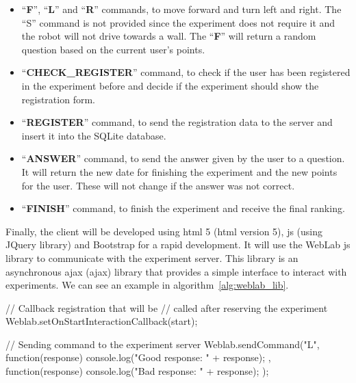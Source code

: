 \begin{itemize}
	\item ``\textbf{F}'', ``\textbf{L}'' and ``\textbf{R}'' commands, to move forward and turn left
	and right. The ``S'' command is not provided since the experiment does not require it and the
	robot will not drive towards a wall. The ``\textbf{F}'' will return a random question based on
	the current user's points.

	\item ``\textbf{CHECK\_REGISTER}'' command, to check if the user has been registered in the
	experiment before and decide if the experiment should show the registration form.

	\item ``\textbf{REGISTER}'' command, to send the registration data to the server and insert it
	into the SQLite database.

	\item ``\textbf{ANSWER}'' command, to send the answer given by the user to a question. It will
	return the new date for finishing the experiment and the new points for the user. These will not
	change if the answer was not correct.

	\item ``\textbf{FINISH}'' command, to finish the experiment and receive the final ranking.
\end{itemize}

Finally, the client will be developed using \acrshort{html} 5 (\acrlong{html} version 5),
\acrlong{js} (using JQuery library) and Bootstrap for a rapid development. It will use the WebLab
\acrlong{js} library to communicate with the experiment server. This library is an asynchronous
\acrshort{ajax} (\acrlong{ajax}) library that provides a simple interface to interact with
experiments. We can see an example in algorithm~\ref{alg:weblab_lib}.

\begin{center}
\begin{minipage}{.9\textwidth}
\singlespace
{}
\begin{pyglist}[language=javascript, caption={WebLab \acrlong{js} library example.},
	label={alg:weblab_lib}, listingname={Algorithm}, numbers=left]
// Callback registration that will be
// called after reserving the experiment
Weblab.setOnStartInteractionCallback(start);

// Sending command to the experiment server
Weblab.sendCommand("L", function(response) {
    console.log("Good response: " + response);
}, function(response) {
    console.log("Bad response: " + response);
});
\end{pyglist}
\end{minipage}
\end{center}

